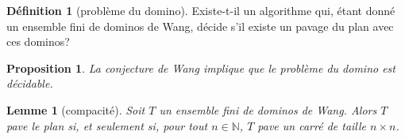 \documentclass{scrartcl}
\newcommand{\N}{\mathbb N}
\newtheorem{lemme}{Lemme}
\newtheorem{proposition}{Proposition}
\theoremstyle{definition}
\newtheorem{definition}{Définition}
\theoremstyle{remark}
\begin{document}
\begin{definition}[problème du domino]
  Existe-t-il un algorithme qui, étant donné un ensemble fini de dominos de Wang, décide s'il existe un pavage du plan avec ces dominos?
\end{definition}

\begin{proposition}
  La conjecture de Wang implique que le problème du domino est décidable.
\end{proposition}

\begin{lemme}[compacité]
  Soit $T$ un ensemble fini de dominos de Wang. Alors $T$ pave le plan si, et seulement si, pour tout $n\in\N$, $T$ pave un carré de taille $n\times n$.
\end{lemme}
\end{document}

